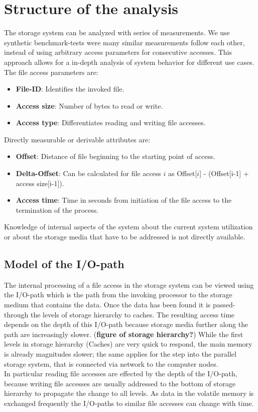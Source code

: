 \documentclass{superfri}
\begin{document}
\section{Structure of the analysis}
The storage system can be analyzed with series of measurements.
We use synthetic benchmark-tests were many similar measurements follow each other, instead of using arbitrary access parameters for consecutive accesses.
This approach allows for a in-depth analysis of system behavior for different use cases.\\
The file access parameters are:
\begin{itemize}
	\item \textbf{File-ID}: Identifies the invoked file.
	\item \textbf{Access size}: Number of bytes to read or write.
	\item \textbf{Access type}: Differentiates reading and writing file accesses.
\end{itemize}
Directly measurable or derivable attributes are:
\begin{itemize}
	\item \textbf{Offset}: Distance of file beginning to the starting point of access.
	\item \textbf{Delta-Offset}: Can be calculated for file access $i$ as Offset[$i$] - (Offset[i-1] + access size[i-1]).
	\item \textbf{Access time}: Time in seconds from initiation of the file access to the termination of the process.
\end{itemize}
Knowledge of internal aspects of the system about the current system utilization or about the storage media that have to be addressed is not directly available.

\subsection{Model of the I/O-path}
The internal processing of a file access in the storage system can be viewed using the I/O-path which is the path from the invoking processor to the storage medium that contains the data. Once the data has been found it is passed-through the levels of storage hierarchy to caches.
The resulting access time depends on the depth of this I/O-path because storage media further along the path are increasingly slower.
(\textbf{figure of storage hierarchy?})
While the first levels in storage hierarchy (Caches) are very quick to respond, the main memory is already magnitudes slower; the same applies for the step into the parallel storage system, that is connected via network to the computer nodes.\\
In particular reading file accesses are effected by the depth of the I/O-path, because writing file accesses are usually addressed to the bottom of storage hierarchy to propagate the change to all levels.
As data in the volatile memory is exchanged frequently the I/O-paths to similar file accesses can change with time.
\end{document}
